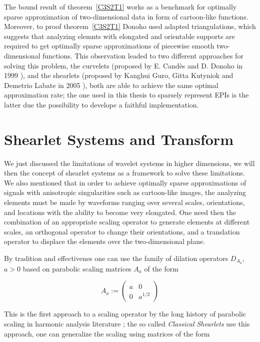 \bigskip

The bound result of theorem~\ref{C3S2T1} works as a benchmark for optimally sparse approximation of two-dimensional data in form of cartoon-like functions. Moreover, to proof theorem~\ref{C3S2T1} Donoho used adapted triangulations, which suggests that analyzing elemnts with elongated and orientable supports are required to get optimally sparse approximations of piecewise smooth two-dimensional functions. This observation leaded to two different approaches for solving this problem, the curvelets (proposed by E. Candès and D. Donoho in 1999 \cite{Curvelets}), and the shearlets (proposed by Kanghui Guro, Gitta Kutyniok and Demetrio Labate in 2005 \cite{FirstShearlets}), both are able to achieve the same optimal approximation rate; the one used in this thesis to sparsely represent EPIs is the latter due the possibility to develope a faithful implementation. 

\section{Shearlet Systems and Transform}
\label{sec:shearletsystem}

We just discussed the limitations of wavelet systems in higher dimensions, we will then the concept of shearlet systems as a framework to solve these limitations. We also mentioned that in order to achieve optimally sparse approximations of signals with anisotropic singularities such as cartoon-like images, the analyzing elements must be made by waveforms ranging over several scales, orientations, and locations with the ability to become very elongated. One need then the combination of an appropriate scaling operator to generate elements at different scales, an orthogonal operator to change their orientations, and a translation operator to displace the elements over the two-dimensional plane. 

\bigskip

By tradition and effectivenes one can use the family of dilation operators $D_{A_a}$, $a>0$ based on parabolic scaling matrices $A_a$ of the form

\begin{equation}
\label{eq:scaling}
A_a:=
\left(
\begin{matrix}
a & 0 \\
0 & a^{1/2}
\end{matrix}
\right)
\end{equation}

This is the first approach to a scaling operator by the long history of parabolic scaling in harmonic analysis literature \cite{Fefferman}; the so called \textit{Classical Shearlets} use this approach, one can generalize the scaling using matrices of the form 

